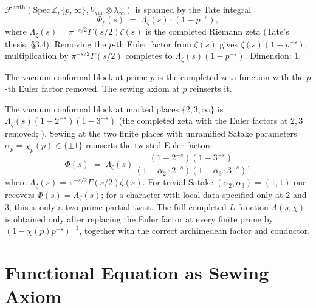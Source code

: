 \begin{computation}
\label{v4-arith:comp:conformal-block-p-infty}
\(\mathcal{F}^{\mathrm{arith}}(\mathrm{Spec}\,\mathbb{Z},\{p,\infty\},V_{\mathrm{vac}}\otimes\lambda_{\infty})\)
is spanned by the Tate integral
\begin{equation}
\Phi_{p}(s)\;=\;\Lambda_{\zeta}(s)\cdot(1-p^{-s}),
\end{equation}
where \(\Lambda_{\zeta}(s)=\pi^{-s/2}\Gamma(s/2)\zeta(s)\) is the completed
Riemann zeta (Tate's thesis, \S3.4). Removing the \(p\)-th Euler factor
from \(\zeta(s)\) gives \(\zeta(s)(1-p^{-s})\); multiplication by
\(\pi^{-s/2}\Gamma(s/2)\) completes to
\(\Lambda_{\zeta}(s)(1-p^{-s})\).
Dimension: \(1\).
\end{computation}

\begin{observation}
\label{v4-arith:obs:vacuum-removes-Euler-factor}
The vacuum conformal block at prime \(p\) is the completed zeta function
with the \(p\)-th Euler factor removed. The sewing axiom at \(p\) reinserts it.
\end{observation}

\begin{computation}[sewing at \(\{2,3\}\)]
\label{v4-arith:comp:sewing-23}
The vacuum conformal block at marked places \(\{2,3,\infty\}\) is
\(\Lambda_{\zeta}(s)(1-2^{-s})(1-3^{-s})\) (the completed zeta with the Euler
factors at \(2,3\) removed; ).
Sewing at the two finite places with unramified Satake parameters
\(\alpha_{p}=\chi_{p}(p)\in\{\pm 1\}\) reinserts the twisted Euler
factors:
\begin{equation*}
\Phi(s)\;=\;\Lambda_{\zeta}(s)\,
\frac{(1-2^{-s})(1-3^{-s})}{(1-\alpha_{2}\cdot 2^{-s})(1-\alpha_{3}\cdot 3^{-s})},
\end{equation*}
where \(\Lambda_{\zeta}(s)=\pi^{-s/2}\Gamma(s/2)\zeta(s)\). For trivial Satake
\((\alpha_{2},\alpha_{3})=(1,1)\) one recovers \(\Phi(s)=\Lambda_{\zeta}(s)\); for
a character with local data specified only at \(2\) and \(3\), this is
only a two-prime partial twist. The full completed \(L\)-function
\(\Lambda(s,\chi)\) is obtained only after replacing the Euler factor
at every finite prime by \((1-\chi(p)p^{-s})^{-1}\), together with the
correct archimedean factor and conductor.
\end{computation}

\section{Functional Equation as Sewing Axiom}
\label{v4-arith:segal:functional-equation}

